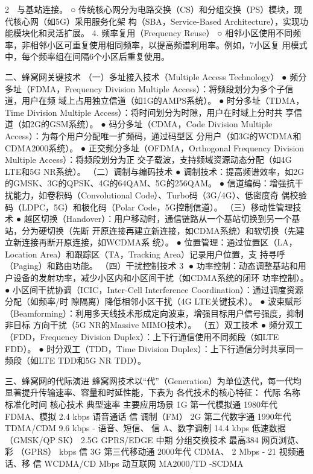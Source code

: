                                                              2
       与基站连接。
     ○ 传统核心网分为电路交换（CS）和分组交换（PS）模块，现代核心网（如5G）采用服务化架
       构（SBA，Service-Based Architecture），实现功能模块化和灵活扩展。
 4. 频率复用（Frequency Reuse）
     ○ 相邻小区使用不同频率，非相邻小区可重复使用相同频率，以提高频谱利用率。例如，7小区复
       用模式中，每个频率组在间隔6个小区后重复使用。


二、蜂窝网关键技术
（一）多址接入技术（Multiple Access Technology）
 ● 频分多址（FDMA，Frequency Division Multiple Access）：将频段划分为多个子信道，用户在频
   域上占用独立信道（如1G的AMPS系统）。
 ● 时分多址（TDMA，Time Division Multiple Access）：将时间划分为时隙，用户在时域上分时共
   享信道（如2G的GSM系统）。
 ● 码分多址（CDMA，Code Division Multiple Access）：为每个用户分配唯一扩频码，通过码型区
   分用户（如3G的WCDMA和CDMA2000系统）。
 ● 正交频分多址（OFDMA，Orthogonal Frequency Division Multiple Access）：将频段划分为正
   交子载波，支持频域资源动态分配（如4G LTE和5G NR系统）。
（二）调制与编码技术
 ● 调制技术：提高频谱效率，如2G的GMSK、3G的QPSK、4G的64QAM、5G的256QAM。
 ● 信道编码：增强抗干扰能力，如卷积码（Convolutional Code）、Turbo码（3G/4G）、低密度奇
   偶校验码（LDPC，5G）和极化码（Polar Code，5G控制信道）。
（三）移动性管理技术
 ● 越区切换（Handover）：用户移动时，通信链路从一个基站切换到另一个基站，分为硬切换（先断
   开原连接再建立新连接，如CDMA系统）和软切换（先建立新连接再断开原连接，如WCDMA系
   统）。
 ● 位置管理：通过位置区（LA，Location Area）和跟踪区（TA，Tracking Area）记录用户位置，支
   持寻呼（Paging）和路由功能。
（四）干扰控制技术
                                                                     3
 ● 功率控制：动态调整基站和用户设备的发射功率，减少小区内和小区间干扰（如CDMA系统的闭环
   功率控制）。
 ● 小区间干扰协调（ICIC，Inter-Cell Interference Coordination）：通过调度资源分配（如频率/时
   隙隔离）降低相邻小区干扰（4G LTE关键技术）。
 ● 波束赋形（Beamforming）：利用多天线技术形成定向波束，增强目标用户信号强度，抑制非目标
   方向干扰（5G NR的Massive MIMO技术）。
（五）双工技术
 ● 频分双工（FDD，Frequency Division Duplex）：上下行通信使用不同频段（如LTE FDD）。
 ● 时分双工（TDD，Time Division Duplex）：上下行通信分时共享同一频段（如LTE TDD和5G NR
   TDD）。


三、蜂窝网的代际演进
蜂窝网技术以“代”（Generation）为单位迭代，每一代均显著提升传输速率、容量和时延性能，下表为
各代技术的核心特征：
 代际      名称           标准化时间 核心技术       典型速率        主要应用场景
 1G      第一代模拟通 1980年代       FDMA、模拟 2.4 kbps      语音通话
         信                   调制（FM）
 2G      第二代数字通 1990年代       TDMA/CDM 9.6 kbps - 语音、短信、
         信                   A、数字调制 14.4 kbps      低速数据
                             （GMSK/QP
                             SK）
 2.5G    GPRS/EDGE 中期        分组交换技术 最高384          网页浏览、彩
                             （GPRS） kbps           信
 3G      第三代移动通 2000年代       CDMA、     2 Mbps - 21 视频通话、移
         信                   WCDMA/CD Mbps         动互联网
                             MA2000/TD
                             -SCDMA



